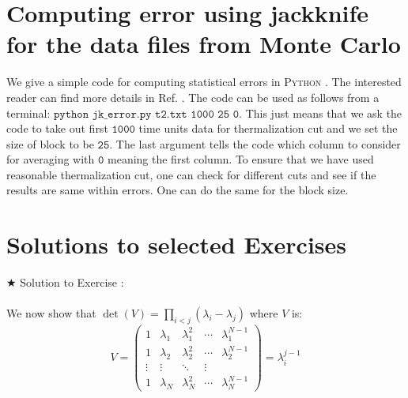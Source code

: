 \documentclass[11pt]{article}
\newcommand{\PY}{\textsc{Python }}
\begin{document}
\begin{footnotesize} 
	\begin{mdframed}[backgroundcolor=mauve!3] 
			
	\end{mdframed} 
\end{footnotesize}


\section{Computing error using jackknife for the data files from Monte Carlo}

We give a simple code for computing statistical errors in \PY. 
The interested reader can find more details in Ref. \cite{2012arXiv1210.3781Y}. 
The code can be used as follows from a terminal:
$\texttt{python jk\_error.py t2.txt 1000 25 0}$. 
This just means that we ask the code to take out first $\texttt{1000}$
time units data for thermalization cut and we set
the size of block to be $\texttt{25}$. The last argument tells the code
which column to consider for averaging with $\texttt{0}$ 
meaning the first column. To ensure that we have used reasonable
thermalization cut, one can check for different cuts and see if the results 
are same within errors. One can do the same for the block size. 

\begin{footnotesize} 
	\begin{mdframed}[backgroundcolor=mauve!3] 
			
	\end{mdframed} 
\end{footnotesize}

\section{Solutions to selected Exercises} 

\noindent $\bigstar$ Solution to Exercise :
\\ \\ 
We now show that $\det(V) = \prod_{i<j} (\lambda_i - \lambda_j)$ where $V$ is: 
\begin{equation*}
	V = 
	\begin{pmatrix}
		1 & \lambda_1 & \lambda_{1}^{2} & \cdots & \lambda_{1}^{N-1} \\
		1 & \lambda_2 & \lambda_{2}^{2} & \cdots & \lambda_{2}^{N-1} \\ 
		\vdots  & \vdots  & \ddots & \vdots  \\
		1 & \lambda_N & \lambda_{N}^{2} & \cdots & \lambda_{N}^{N-1} 
	\end{pmatrix} = \lambda_{i}^{j-1} 
\end{equation*}
\end{document}
